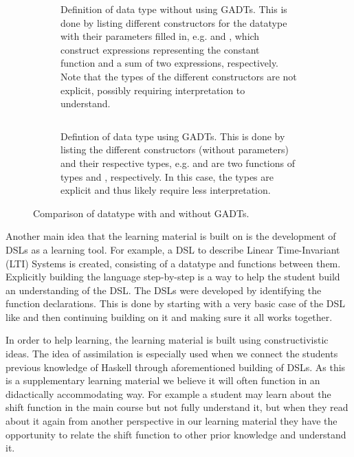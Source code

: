 \begin{figure}[H]
    \begin{subfigure}{0.999\textwidth}
    \centering 
    \inputminted[autogobble]{haskell}{code/expression_no_gadts.hs}
    \caption{Definition of  data type without using \gls{GADTs}. This is done by listing different constructors for the datatype with their parameters filled in, e.g.  and , which construct expressions representing the constant function and a sum of two expressions, respectively. Note that the types of the different constructors are not explicit, possibly requiring interpretation to understand.}
    \label{code:expression_vanilla}
    \end{subfigure}  
    \begin{subfigure}{0.999\textwidth}
    \vspace{12pt} %
    \centering
    \inputminted[autogobble]{haskell}{code/expression_gadts.hs}
    \caption{Defintion of  data type using \gls{GADTs}. This is done by listing the different constructors (without parameters) and their respective types, e.g.  and \cmd{(:+:)} are two functions of types  and , respectively. In this case, the types are explicit and thus likely require less interpretation.}
    \label{code:expression_gadts}
    \end{subfigure} 
    \caption{Comparison of  datatype with and without \gls{GADTs}.}
    \label{code:gadts_comparison}
\end{figure}

Another main idea that the learning material is built on is the development of \gls{DSL}s as a learning tool. For example, a \gls{DSL} to describe Linear Time-Invariant (\gls{LTI}) Systems is created, consisting of a datatype and functions between them. Explicitly building the language step-by-step is a way to help the student build an understanding of the \gls{DSL}. The DSLs were developed by identifying the function declarations. This is done by starting with a very basic case of the \gls{DSL} like  and then continuing building on it and making sure it all works together. 

In order to help learning, the learning material is built using constructivistic ideas. The idea of assimilation is especially used when we connect the students previous knowledge of \gls{Haskell} through aforementioned building of \gls{DSL}s. As this is a supplementary learning material we believe it will often function in an didactically accommodating way. For example a student may learn about the shift function in the main course but not fully understand it, but when they read about it again from another perspective in our learning material they have the opportunity to relate the shift function to other prior knowledge and understand it.


